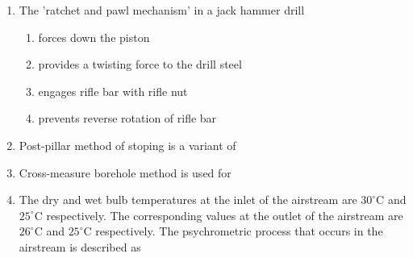 \documentclass[journal,12pt,onecolumn]{IEEEtran}
\theoremstyle{remark}
\begin{document}
\begin{enumerate}
\item The 'ratchet and pawl mechanism' in a jack hammer drill

\hfill{}

\begin{enumerate}
\item forces down the piston
\item provides a twisting force to the drill steel
\item engages rifle bar with rifle nut
\item prevents reverse rotation of rifle bar
\end{enumerate}

\item Post-pillar method of stoping is a variant of

\hfill{}

\begin{enumerate}
\end{enumerate}

\item Cross-measure borehole method is used for

\hfill{}

\begin{enumerate}
\end{enumerate}

\item The dry and wet bulb temperatures at the inlet of the airstream are $30^{\circ}$C and $25^{\circ}$C respectively. The corresponding values at the outlet of the airstream are $26^{\circ}$C and $25^{\circ}$C respectively. The psychrometric process that occurs in the airstream is described as

\hfill{}


\end{enumerate}
\end{document}
